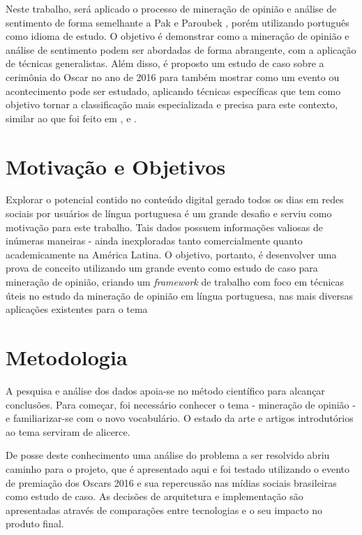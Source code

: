 Neste trabalho, será aplicado o processo de mineração de opinião e análise de sentimento de forma semelhante a Pak e Paroubek \cite{pak2010twitter}, porém utilizando português como idioma de estudo. O objetivo é demonstrar como a mineração de opinião e análise de sentimento podem ser abordadas de forma abrangente, com a aplicação de técnicas generalistas. Além disso, é proposto um estudo de caso sobre a cerimônia do Oscar no ano de 2016 para também mostrar como um evento ou acontecimento pode ser estudado, aplicando técnicas específicas que tem como objetivo tornar a classificação mais especializada e precisa para este contexto, similar ao que foi feito em \cite{rodrigues2012characterizing},  \cite{franca2014analise} e \cite{carvalho2014mineraccao}.


\section{Motivação e Objetivos}\label{sec:1_inicio}
Explorar o potencial contido no conteúdo digital gerado todos os dias em redes sociais por usuários de língua portuguesa é um grande desafio e serviu como motivação para este trabalho. Tais dados possuem informações valiosas de inúmeras maneiras - ainda inexploradas tanto comercialmente quanto academicamente na América Latina. 
O objetivo, portanto, é desenvolver uma prova de conceito utilizando um grande evento como estudo de caso para mineração de opinião, criando um \textit{framework} de trabalho com foco em técnicas úteis no estudo da mineração de opinião em língua portuguesa, nas mais diversas aplicações existentes para o tema


\section{Metodologia}
A pesquisa e análise dos dados apoia-se no método científico para alcançar conclusões. Para começar, foi necessário conhecer o tema - mineração de opinião - e familiarizar-se com o novo vocabulário. O estado da arte e artigos introdutórios ao tema serviram de alicerce.

De posse deste conhecimento uma análise do problema a ser resolvido abriu caminho para o projeto, que é apresentado aqui e foi testado utilizando o evento de premiação dos Oscars 2016 e sua repercussão nas mídias sociais brasileiras como estudo de caso. As decisões de arquitetura e implementação são apresentadas através de comparações entre tecnologias e o seu impacto no produto final.

